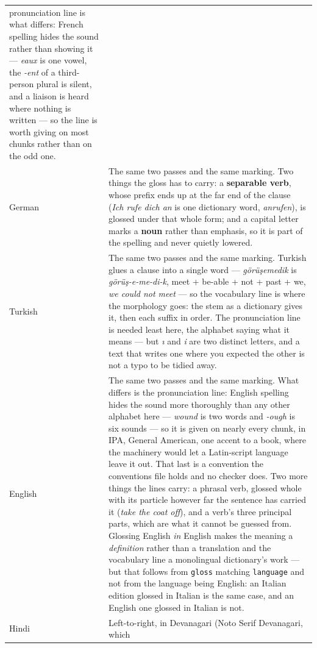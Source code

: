 \documentclass[11pt,oneside]{report}
\newcommand{\fw}[1]{\foreignlanguage{french}{\emph{#1}}}
\newcommand{\gw}[1]{\foreignlanguage{ngerman}{\emph{#1}}}
\newcommand{\tw}[1]{\foreignlanguage{turkish}{\emph{#1}}}
\begin{document}
\begin{center}
\begin{longtable}{@{}p{}p{}@{}}
  pronunciation line is what differs: French spelling hides the sound rather
  than showing it --- \fw{eaux} is one vowel, the \fw{-ent} of a
  third-person plural is silent, and a liaison is heard where nothing is
  written --- so the line is worth giving on most chunks rather than on the
  odd one. \\
\addlinespace
\textsf{German} & The same two passes and the same marking. Two things the
  gloss has to carry: a \textbf{separable verb}, whose prefix ends up at the
  far end of the clause (\gw{Ich rufe dich an} is one dictionary word,
  \gw{anrufen}), is glossed under that whole form; and a capital letter
  marks a \textbf{noun} rather than emphasis, so it is part of the spelling
  and never quietly lowered. \\
\addlinespace
\textsf{Turkish} & The same two passes and the same marking. Turkish glues a
  clause into a single word --- \tw{görüşemedik} is
  \emph{görüş-e-me-di-k}, meet + be-able + not + past + we, \emph{we could
  not meet} --- so the vocabulary line is where the morphology goes: the stem
  as a dictionary gives it, then each suffix in order. The pronunciation line
  is needed least here, the alphabet saying what it means --- but \tw{ı} and
  \tw{i} are two distinct letters, and a text that writes one where you
  expected the other is not a typo to be tidied away. \\
\addlinespace
\textsf{English} & The same two passes and the same marking. What differs is
  the pronunciation line: English spelling hides the sound more thoroughly
  than any other alphabet here --- \emph{wound} is two words and \emph{-ough}
  is six sounds --- so it is given on nearly every chunk, in IPA, General
  American, one accent to a book, where the machinery would let a
  Latin-script language leave it out. That last is a convention the
  conventions file holds and no checker does. Two more things the lines
  carry: a phrasal verb, glossed whole with its particle however far the
  sentence has carried it (\emph{take the coat off}), and a verb's three
  principal parts, which are what it cannot be guessed from. Glossing English
  \emph{in} English makes the meaning a \emph{definition} rather than a
  translation and the vocabulary line a monolingual dictionary's work --- but
  that follows from \texttt{gloss} matching \texttt{language} and not from the
  language being English: an Italian edition glossed in Italian is the same
  case, and an English one glossed in Italian is not. \\
\addlinespace
\textsf{Hindi} & Left-to-right, in Devanagari (Noto Serif Devanagari, which

\end{longtable}
\end{center}
\end{document}
